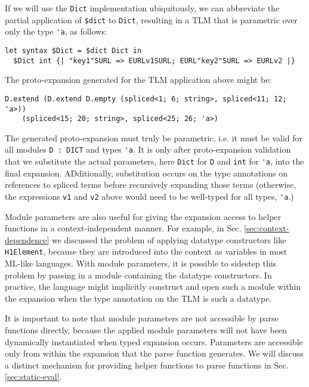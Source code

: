 \documentclass[acmsmall,10pt,review,anonymous]{acmart}\settopmatter{printfolios=true}
\newcommand{\li}[1]{\lstinline{#1}}
\begin{document}
If we will use the \li{Dict} implementation ubiquitously, we can abbreviate the partial application of \li{$dict} to \li{Dict}, resulting in a TLM that is parametric over only the type \li{'a}, as follows:
\begin{lstlisting}[numbers=none]
  let syntax $Dict = $dict Dict in 
  $Dict int {| "key1"SURL => EURLv1SURL; EURL"key2"SURL => EURLv2 |}
\end{lstlisting}
The proto-expansion generated for the TLM application above might be:
\begin{lstlisting}[numbers=none]
  D.extend (D.extend D.empty (spliced<1; 6; string>, spliced<11; 12; 'a>)) 
    (spliced<15; 20; string>, spliced<25; 26; 'a>)
\end{lstlisting}
The generated proto-expansion must truly be parametric, i.e. it must be valid for all modules \li{D : DICT} and types \li{'a}. It is only after proto-expansion validation that we substitute the actual parameters, here \li{Dict} for \li{D} and \li{int} for \li{'a}, into the final expansion. ADditionally, substitution occurs on the type annotations on references to spliced terms before recursively expanding those terms (otherwise, the expressions \li{v1} and \li{v2} above would need to be well-typed for all types, \li{'a}.)

Module parameters are also useful for giving the expansion access to helper functions in a context-independent manner. For example, in Sec. \ref{sec:context-dependence} we discussed the problem of applying datatype constructors like \li{H1Element}, because they are introduced into the context as variables in most ML-like languages. With module parameters, it is possible to sidestep this problem by passing in a module containing the datatype constructors. In practice, the language might implicitly construct and open such a module within the expansion when the type annotation on the TLM is such a datatype. 

It is important to note that module parameters are not accessible by parse functions directly, because the applied module parameters will not have been dynamically instantiated when typed expansion occurs. Parameters are accessible only from within the expansion that the parse function generates. We will discuss a distinct mechanism for providing helper functions to parse functions in Sec. \ref{sec:static-eval}. 
\end{document}
